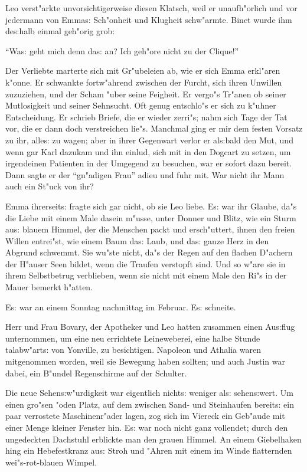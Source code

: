 \documentclass[oneside,12pt]{book}
\newcommand{\s}{s:}%
\begin{document}
Leo verst"arkte unvorsichtigerweise diesen Klatsch, weil er
unaufh"orlich und vor jedermann von Emma{\s} Sch"onheit und
Klugheit schw"armte. Binet wurde ihm de{\s}halb einmal geh"orig
grob:

"`Wa{\s} geht mich denn da{\s} an? Ich geh"ore nicht zu der
Clique!"'

Der Verliebte marterte sich mit Gr"ubeleien ab, wie er sich Emma
erkl"aren k"onne. Er schwankte fortw"ahrend zwischen der Furcht,
sich ihren Unwillen zuzuziehen, und der Scham "uber seine
Feigheit. Er vergo"s Tr"anen ob seiner Mutlosigkeit und seiner
Sehnsucht. Oft genug entschlo"s er sich zu k"uhner Entscheidung.
Er schrieb Briefe, die er wieder zerri"s; nahm sich Tage der Tat
vor, die er dann doch verstreichen lie"s. Manchmal ging er mir dem
festen Vorsatz zu ihr, alle{\s} zu wagen; aber in ihrer Gegenwart
verlor er al{\s}bald den Mut, und wenn gar Karl dazukam und ihn
einlud, sich mit in den Dogcart zu setzen, um irgendeinen
Patienten in der Umgegend zu besuchen, war er sofort dazu bereit.
Dann sagte er der "`gn"adigen Frau"' adieu und fuhr mit. War nicht
ihr Mann auch ein St"uck von ihr?

Emma ihrerseit{\s} fragte sich gar nicht, ob sie Leo liebe. E{\s}
war ihr Glaube, da"s die Liebe mit einem Male dasein m"usse, unter
Donner und Blitz, wie ein Sturm au{\s} blauem Himmel, der die
Menschen packt und ersch"uttert, ihnen den freien Willen
entrei"st, wie einem Baum da{\s} Laub, und da{\s} ganze Herz in
den Abgrund schwemmt. Sie wu"ste nicht, da"s der Regen auf den
flachen D"achern der H"auser Seen bildet, wenn die Traufen
verstopft sind. Und so w"are sie in ihrem Selbstbetrug verblieben,
wenn sie nicht mit einem Male den Ri"s in der Mauer bemerkt
h"atten.


\newpage\begin{center}
{\large \so{F"unfte{\s} Kapitel}}\bigskip\bigskip
\end{center}

E{\s} war an einem Sonntag nachmittag im Februar. E{\s} schneite.

Herr und Frau Bovary, der Apotheker und Leo hatten zusammen einen
Au{\s}flug unternommen, um eine neu errichtete Leineweberei, eine
halbe Stunde talabw"art{\s} von Yonville, zu besichtigen. Napoleon
und Athalia waren mitgenommen worden, weil sie Bewegung haben
sollten; und auch Justin war dabei, ein B"undel Regenschirme auf
der Schulter.

Die neue Sehen{\s}w"urdigkeit war eigentlich nicht{\s} weniger
al{\s} sehen{\s}wert. Um einen gro"sen "oden Platz, auf dem
zwischen Sand- und Steinhaufen bereit{\s} ein paar verrostete
Maschinenr"ader lagen, zog sich im Viereck ein Geb"aude mit einer
Menge kleiner Fenster hin. E{\s} war noch nicht ganz vollendet;
durch den ungedeckten Dachstuhl erblickte man den grauen Himmel.
An einem Giebelhaken hing ein Hebefestkranz au{\s} Stroh und
"Ahren mit einem im Winde flatternden wei"s-rot-blauen Wimpel.
\end{document}
